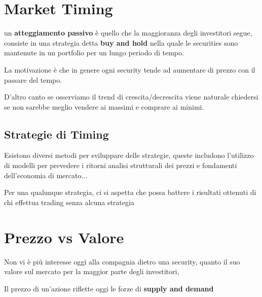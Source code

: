 \documentclass[a4paper,11pt]{report}
\begin{document}
{\section{Market Timing}
	un \textbf{atteggiamento passivo} è quello che la maggioranza degli investitori segue, consiste in una strategia detta 				\textbf{buy and hold} nella quale le securities sono mantenute in un portfolio per un lungo periodo di tempo.

	La motivazione è che in genere ogni security tende ad aumentare di prezzo con il passare del tempo.

	D'altro canto se osserviamo il trend di crescita/decrescita viene naturale chiedersi se non sarebbe meglio vendere ai massimi e 	comprare ai minimi.
\subsection{Strategie di Timing}
	Esistono diversi metodi per sviluppare delle strategie, queste includono l'utilizzo di modelli per prevedere i ritorni %
	analisi strutturali dei prezzi e fondamenti dell'economia di mercato...

	Per una qualunque strategia, ci si aspetta che possa battere i risultati ottenuti di chi effettua trading senza alcuna strategia
\section{Prezzo vs Valore}
	Non vi è più interesse oggi alla compagnia dietro una security, quanto il suo valore sul mercato per la maggior parte degli 		 	investitori,

	Il prezzo di un'azione riflette oggi le forze di \textbf{supply and demand}
}
\end{document}
